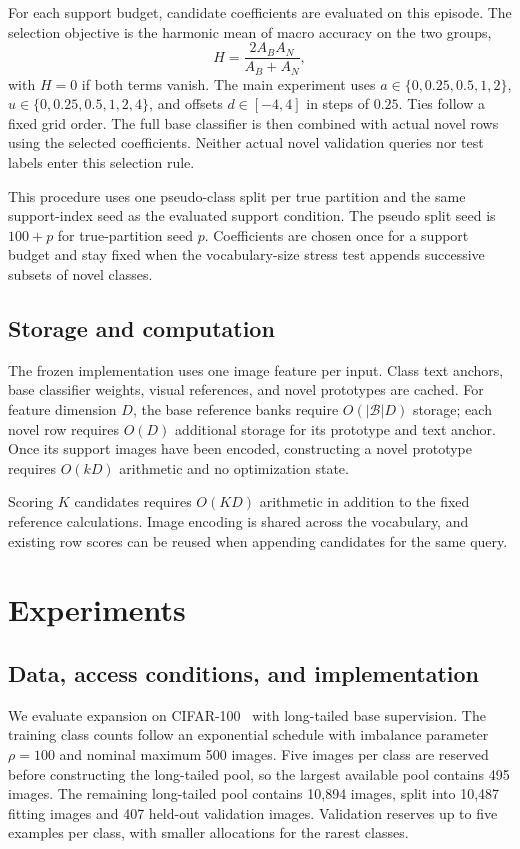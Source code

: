 \documentclass[research]{fcs}
\begin{document}
For each support budget, candidate coefficients are evaluated on this episode. The selection objective is the harmonic mean of macro accuracy on the two groups,
\begin{equation}
 H=\frac{2A_BA_N}{A_B+A_N},
 \label{eq:harmonic}
\end{equation}
with $H=0$ if both terms vanish. The main experiment uses $a\in\{0,0.25,0.5,1,2\}$, $u\in\{0,0.25,0.5,1,2,4\}$, and offsets $d\in[-4,4]$ in steps of $0.25$. Ties follow a fixed grid order. The full base classifier is then combined with actual novel rows using the selected coefficients. Neither actual novel validation queries nor test labels enter this selection rule.

This procedure uses one pseudo-class split per true partition and the same support-index seed as the evaluated support condition. The pseudo split seed is $100+p$ for true-partition seed $p$. Coefficients are chosen once for a support budget and stay fixed when the vocabulary-size stress test appends successive subsets of novel classes.

\subsection{Storage and computation}
The frozen implementation uses one image feature per input. Class text anchors, base classifier weights, visual references, and novel prototypes are cached. For feature dimension $D$, the base reference banks require $O(|\mathcal B|D)$ storage; each novel row requires $O(D)$ additional storage for its prototype and text anchor. Once its support images have been encoded, constructing a novel prototype requires $O(kD)$ arithmetic and no optimization state.

Scoring $K$ candidates requires $O(KD)$ arithmetic in addition to the fixed reference calculations. Image encoding is shared across the vocabulary, and existing row scores can be reused when appending candidates for the same query.

\section{Experiments}
\subsection{Data, access conditions, and implementation}
We evaluate expansion on CIFAR-100~\cite{krizhevsky2009cifar} with long-tailed base supervision. The training class counts follow an exponential schedule with imbalance parameter $\rho=100$ and nominal maximum 500 images. Five images per class are reserved before constructing the long-tailed pool, so the largest available pool contains 495 images. The remaining long-tailed pool contains 10,894 images, split into 10,487 fitting images and 407 held-out validation images. Validation reserves up to five examples per class, with smaller allocations for the rarest classes.
\end{document}
